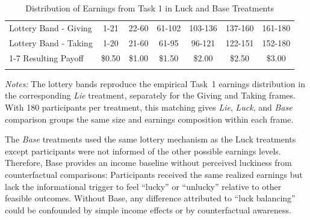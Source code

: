 \documentclass{article}
\begin{document}
\par
\begin{table}[htbp]
    \centering
    \small
    \caption{Distribution of Earnings from Task 1 in Luck and Base Treatments}
        \begin{tabular}{ l  c  c c c c c }
        \toprule \toprule
        Lottery Band - Giving \phantom{dot}& 1-21 & 22-60 & 61-102 & 103-136 & 137-160 & 161-180 \\ 
        Lottery Band - Taking \phantom{dot}& 1-20 & 21-60 & 61-95 & 96-121 & 122-151 & 152-180
        \\ \cmidrule(lr){1-7}
        Resulting Payoff \phantom{dot}& \$0.50 & \$1.00 & \$1.50 & \$2.00 & \$2.50 & \$3.00 \\
        \bottomrule \bottomrule
        \label{EndowmentLuck}
    \end{tabular}
    \par\smallskip
    \begin{minipage}{\textwidth}
        \footnotesize\textit{Notes:} The lottery bands reproduce the empirical Task~1 earnings distribution in the corresponding \textit{Lie} treatment, separately for the Giving and Taking frames. With 180 participants per treatment, this matching gives \textit{Lie}, \textit{Luck}, and \textit{Base} comparison groups the same size and earnings composition within each frame.
    \end{minipage}
\end{table} 
The \textit{Base} treatments used the same lottery mechanism as the Luck treatments except participants were not informed of the other possible earnings levels. Therefore, Base provides an income baseline without perceived luckiness from counterfactual comparisons: Participants received the same realized earnings but lack the informational trigger to feel “lucky” or “unlucky” relative to other feasible outcomes. Without Base, any difference attributed to “luck balancing” could be confounded by simple income effects or by counterfactual awareness.
\par
\end{document}
